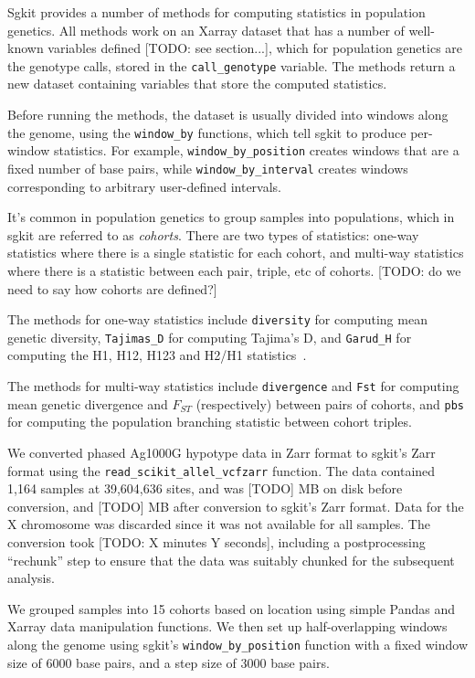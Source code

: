 \documentclass[a4paper,num-refs]{oup-contemporary}
\newcommand{\sgapi}[1]{\texttt{#1}}
\begin{document}
Sgkit provides a number of methods for computing statistics in population
genetics. All methods work on an Xarray dataset that has a number of well-known
variables defined [TODO: see section...], which for population genetics are the
genotype calls, stored in the \sgapi{call\_genotype} variable. The methods return a
new dataset containing variables that store the computed statistics.

Before running the methods, the dataset is usually divided into windows along
the genome, using the \sgapi{window\_by} functions, which tell sgkit to produce
per-window statistics. For example, \sgapi{window\_by\_position} creates windows that
are a fixed number of base pairs, while \sgapi{window\_by\_interval} creates windows
corresponding to arbitrary user-defined intervals.

It's common in population genetics to group samples into populations, which in
sgkit are referred to as \emph{cohorts}. There are two types of statistics: one-way
statistics where there is a single statistic for each cohort, and multi-way
statistics where there is a statistic between each pair, triple, etc of
cohorts. [TODO: do we need to say how cohorts are defined?]

The methods for one-way statistics include \sgapi{diversity} for computing mean
genetic diversity, \sgapi{Tajimas\_D} for computing Tajima’s D, and
\sgapi{Garud\_H} for
computing the H1, H12, H123 and H2/H1 statistics~\citep{garud2015recent}.

The methods for multi-way statistics include \sgapi{divergence} and
\sgapi{Fst} for
computing mean genetic divergence and $F_{ST}$ (respectively) between pairs of
cohorts, and \sgapi{pbs} for computing the population branching statistic between
cohort triples.

We converted phased Ag1000G hypotype data in Zarr format
to sgkit's Zarr format
using the \sgapi{read\_scikit\_allel\_vcfzarr} function.
The data contained 1,164
samples at 39,604,636 sites, and was [TODO] MB on disk before conversion, and
[TODO] MB after conversion to sgkit's Zarr format. Data for the X chromosome
was discarded since it was not available for all samples. The conversion took
[TODO: X minutes Y seconds], including a postprocessing ``rechunk'' step to
ensure that the data was suitably chunked for the subsequent analysis.

We grouped samples into 15 cohorts based on location using simple Pandas and
Xarray data manipulation functions. We then set up half-overlapping windows
along the genome using sgkit's \sgapi{window\_by\_position} function with a fixed
window size of 6000 base pairs, and a step size of 3000 base pairs.
\end{document}
